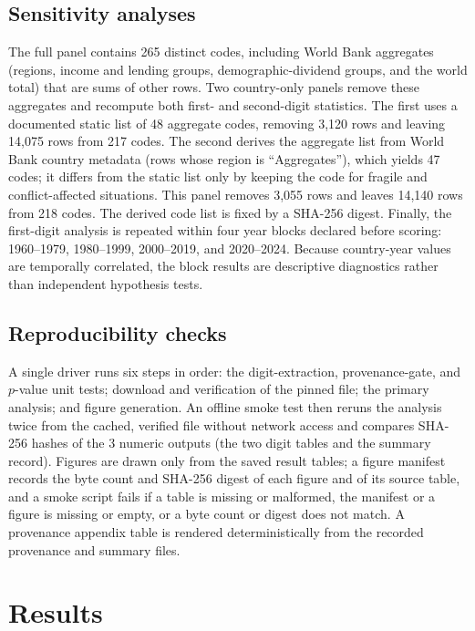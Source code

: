 \documentclass[sigconf,nonacm]{acmart}
\begin{document}
\subsection{Sensitivity analyses}
The full panel contains 265 distinct codes, including World Bank aggregates (regions, income and lending groups, demographic-dividend groups, and the world total) that are sums of other rows. Two country-only panels remove these aggregates and recompute both first- and second-digit statistics. The first uses a documented static list of 48 aggregate codes, removing 3,120 rows and leaving 14,075 rows from 217 codes. The second derives the aggregate list from World Bank country metadata (rows whose region is ``Aggregates''), which yields 47 codes; it differs from the static list only by keeping the code for fragile and conflict-affected situations. This panel removes 3,055 rows and leaves 14,140 rows from 218 codes. The derived code list is fixed by a SHA-256 digest. Finally, the first-digit analysis is repeated within four year blocks declared before scoring: 1960--1979, 1980--1999, 2000--2019, and 2020--2024. Because country-year values are temporally correlated, the block results are descriptive diagnostics rather than independent hypothesis tests.

\subsection{Reproducibility checks}
A single driver runs six steps in order: the digit-extraction, provenance-gate, and \(p\)-value unit tests; download and verification of the pinned file; the primary analysis; and figure generation. An offline smoke test then reruns the analysis twice from the cached, verified file without network access and compares SHA-256 hashes of the 3 numeric outputs (the two digit tables and the summary record). Figures are drawn only from the saved result tables; a figure manifest records the byte count and SHA-256 digest of each figure and of its source table, and a smoke script fails if a table is missing or malformed, the manifest or a figure is missing or empty, or a byte count or digest does not match. A provenance appendix table is rendered deterministically from the recorded provenance and summary files.

\section{Results}
\label{sec:results}
\end{document}
